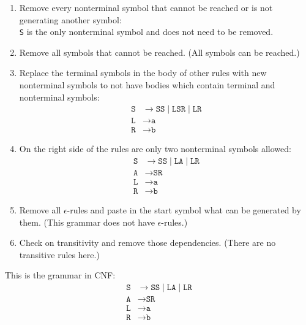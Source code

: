\documentclass[a4paper, 11pt]{article}
\begin{document}
\begin{enumerate}

\item Remove every nonterminal symbol that cannot be reached or is not generating another symbol: \\
\texttt{S} is the only nonterminal symbol and does not need to be removed.

\item Remove all symbols that cannot be reached. (All symbols can be reached.)

\item Replace the terminal symbols in the body of other rules with new nonterminal symbols to not have bodies which contain terminal and nonterminal symbols:
\begin{align*}
\texttt{S} & \rightarrow \texttt{SS} \mid  \texttt{LSR} \mid \texttt{LR}  \\
\texttt{L} & \rightarrow \texttt{a} \\
\texttt{R} & \rightarrow \texttt{b} 
\end{align*}


\item On the right side of the rules are only two nonterminal symbols allowed:
\begin{align*}
\texttt{S} & \rightarrow \texttt{SS} \mid  \texttt{LA} \mid \texttt{LR}  \\
\texttt{A} & \rightarrow \texttt{SR} \\
\texttt{L} & \rightarrow \texttt{a} \\
\texttt{R} & \rightarrow \texttt{b} 
\end{align*}

\item Remove all $\epsilon$-rules and paste in the start symbol what can be generated by them. (This grammar does not have $\epsilon$-rules.)

\item Check on transitivity and remove those dependencies. (There are no transitive rules here.)

\end{enumerate}

This is the grammar in CNF:
\begin{align*}
\texttt{S} & \rightarrow \texttt{SS} \mid  \texttt{LA} \mid \texttt{LR}  \\
\texttt{A} & \rightarrow \texttt{SR} \\
\texttt{L} & \rightarrow \texttt{a} \\
\texttt{R} & \rightarrow \texttt{b} 
\end{align*}





\fancyhead[LO]{\empty}




\newpage
{}
{}
\printbibliography
\end{document}

